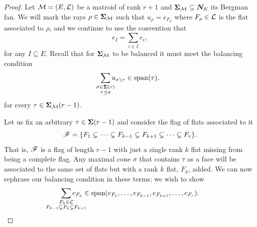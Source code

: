 \documentclass[12pt,oneside]{../../sfsuthesis}
\begin{document}
\begin{proof}
    Let \( \mathcal{M} = (E, \mathcal{L}) \) be a matroid of rank \( r + 1 \) and \( {\bm{\Sigma}}_{\mathcal{M}} \subseteq \bm{N}_E \) its Bergman fan.
    We will mark the rays \( \rho \in {\bm{\Sigma}}_{\mathcal{M}} \) such that \( u_\rho = e_{F_\rho} \) where \( F_\rho \in \mathcal{L} \) is the flat associated to \( \rho \), and we continue to use the convention that
    \[
        e_{I} = \sum_{i \in I} e_i,
    \]
    for any \( I \subseteq E \).
    Recall that for \( {\bm{\Sigma}}_{\mathcal{M}} \) to be balanced it must meet the balancing condition
    \[
        \sum_{\mathclap{\substack{\sigma \in \bSigma(r) \\ \tau \preceq \sigma}}} u_{\sigma \setminus \tau} \in \Span(\tau),
    \]
    for every \( \tau \in {\bm{\Sigma}}_{\mathcal{M}}(r-1) \).

    Let us fix an arbitrary \( \tau \in {\bm{\Sigma}}(r-1) \) and consider the flag of flats associated to it
    \[
        \mathscr{F} = \{ F_1 \subsetneq \cdots \subsetneq F_{k-1} \subsetneq  F_{k+1} \subsetneq \cdots \subsetneq F_{r} \}.
    \]
    That is, \( \mathscr{F} \) is a flag of length \( r - 1 \) with just a single rank \( k \) flat missing from being a complete flag.
    Any maximal cone \( \sigma \) that contains \( \tau \) as a face will be associated to the same set of flats but with a rank \( k \) flat, \( F_{k} \), added.
    We can now rephrase our balancing condition in these terms; we wish to show
    \[
        \sum_{\mathclap{\substack{F_k \in \cL \\ F_{k-1} \subsetneq F_k \subsetneq F_{k+1} }}} e_{F_{k}} \in \Span(e_{F_1}, \dots, e_{F_{k-1}}, e_{F_{k+1}}, \dots, e_{F_r}).
    \]



\end{proof}
\end{document}
